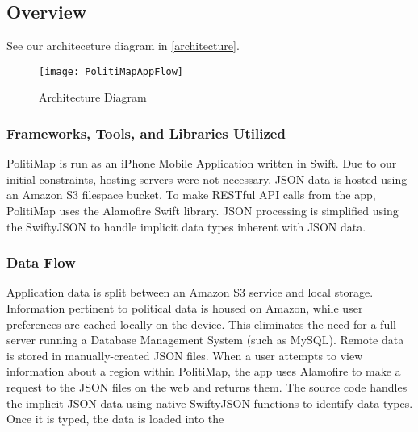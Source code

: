 \subsection{Overview}
See our architeceture diagram in \vref{architecture}.
\begin{figure}
\begin{center}
\texttt{[image: PolitiMapAppFlow]}
\end{center}
\caption{\label{architecture}Architecture Diagram}
\end{figure}
\subsubsection{Frameworks, Tools, and Libraries Utilized}
PolitiMap is run as an iPhone Mobile Application written in Swift. Due
to our initial constraints, hosting servers were not necessary. JSON data
is hosted using an Amazon S3 filespace bucket. To make RESTful API calls
from the app, PolitiMap uses the Alamofire Swift library. JSON processing
is simplified using the SwiftyJSON to handle implicit data types inherent
with JSON data.
\subsubsection{Data Flow}
Application data is split between an Amazon S3 service and local storage.
Information pertinent to political data is housed on Amazon, while user
preferences are cached locally on the device. This eliminates the need for
a full server running a Database Management System (such as MySQL). Remote
data is stored in manually-created JSON files. When a user attempts to view
information about a region within PolitiMap, the app uses Alamofire
to make a request to the JSON files on the web and returns them. The source
code handles the implicit JSON data using native SwiftyJSON functions to
identify data types. Once it is typed, the data is loaded into the 
